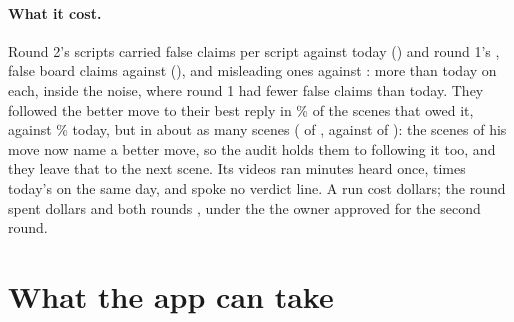\documentclass[11pt]{article}
\begin{document}
\paragraph{What it cost.} Round 2's scripts carried \TwoFalse{} false claims per script against
\BaseFalse{} today (\TwoFalseDiff) and round 1's \CandFalse, \TwoBoardFalse{} false board claims
against \BaseBoardFalse{} (\TwoBoardDiff), and \TwoMisleading{} misleading ones against
\BaseMisleading: more than today on each, inside the noise, where round 1 had fewer false claims
than today. They followed the better move to their best reply in \TwoThenWhat\% of the scenes
that owed it, against \BaseThenWhat\% today, but in about as many scenes (\TwoThenMade{} of
\TwoThenOwed, against \BaseThenMade{} of \BaseThenOwed): the scenes of his move now name a better
move, so the audit holds them to following it too, and they leave that to the next scene. Its videos ran
\TwoHeard{} minutes heard once, \TwoLengthRatio{} times today's on the same day, and spoke no verdict
line. A run cost \TwoCost{} dollars; the round spent \TwoSpent{} dollars and both rounds
\BothSpent{}, under the \TwoCap{} the owner approved for the second round.

\begin{table}[h]
\centering
\small\ItemsTwoTable
\caption{What the audit finds in the moment scenes in each round, pooled over the \Days{} days: the
share of the scenes that owe an item and make it, with the number owing it in brackets.}
\label{tab:items2}
\end{table}

\begin{table}[h]
\centering
\scriptsize\setlength{\tabcolsep}{4pt}\TwoDayTable
\caption{Each day in round 2: the judge's verdict on each criterion from round 2's side ($+$ round 2,
$-$ today's code, 0 a tie), the length over today's, the verdict lines it spoke, and the share of
the asked moves each made.}
\label{tab:days2}
\end{table}

\section{What the app can take}
\end{document}
